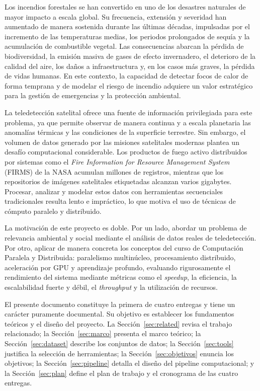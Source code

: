 Los incendios forestales se han convertido en uno de los desastres naturales de mayor impacto a escala global. Su frecuencia, extensión y severidad han aumentado de manera sostenida durante las últimas décadas, impulsadas por el incremento de las temperaturas medias, los periodos prolongados de sequía y la acumulación de combustible vegetal. Las consecuencias abarcan la pérdida de biodiversidad, la emisión masiva de gases de efecto invernadero, el deterioro de la calidad del aire, los daños a infraestructura y, en los casos más graves, la pérdida de vidas humanas. En este contexto, la capacidad de detectar focos de calor de forma temprana y de modelar el riesgo de incendio adquiere un valor estratégico para la gestión de emergencias y la protección ambiental.

La teledetección satelital ofrece una fuente de información privilegiada para este problema, ya que permite observar de manera continua y a escala planetaria las anomalías térmicas y las condiciones de la superficie terrestre. Sin embargo, el volumen de datos generado por las misiones satelitales modernas plantea un desafío computacional considerable. Los productos de fuego activo distribuidos por sistemas como el \textit{Fire Information for Resource Management System} (FIRMS) de la NASA acumulan millones de registros, mientras que los repositorios de imágenes satelitales etiquetadas alcanzan varios gigabytes. Procesar, analizar y modelar estos datos con herramientas secuenciales tradicionales resulta lento e impráctico, lo que motiva el uso de técnicas de cómputo paralelo y distribuido.

La motivación de este proyecto es doble. Por un lado, abordar un problema de relevancia ambiental y social mediante el análisis de datos reales de teledetección. Por otro, aplicar de manera concreta los conceptos del curso de Computación Paralela y Distribuida: paralelismo multinúcleo, procesamiento distribuido, aceleración por GPU y aprendizaje profundo, evaluando rigurosamente el rendimiento del sistema mediante métricas como el \textit{speedup}, la eficiencia, la escalabilidad fuerte y débil, el \textit{throughput} y la utilización de recursos.

El presente documento constituye la primera de cuatro entregas y tiene un carácter puramente documental. Su objetivo es establecer los fundamentos teóricos y el diseño del proyecto. La Sección~\ref{sec:related} revisa el trabajo relacionado; la Sección~\ref{sec:marco} presenta el marco teórico; la Sección~\ref{sec:dataset} describe los conjuntos de datos; la Sección~\ref{sec:tools} justifica la selección de herramientas; la Sección~\ref{sec:objetivos} enuncia los objetivos; la Sección~\ref{sec:pipeline} detalla el diseño del pipeline computacional; y la Sección~\ref{sec:plan} define el plan de trabajo y el cronograma de las cuatro entregas.

